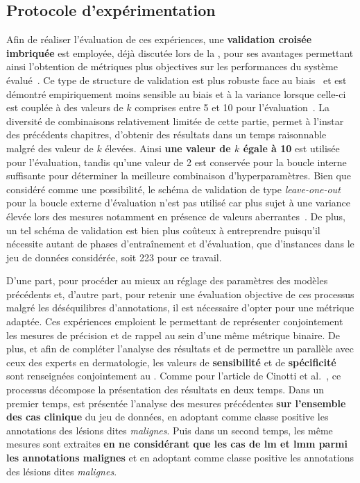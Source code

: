 \subsection{Protocole d'expérimentation}
Afin de réaliser l'évaluation de ces expériences, une \textbf{validation croisée imbriquée} est employée, déjà discutée lors de la , pour ses avantages permettant ainsi l'obtention de métriques plus objectives sur les performances du système évalué~\cite{Cawley2010}. Ce type de structure de validation est plus robuste face au biais~\cite{Cawley2010} et est démontré empiriquement moins sensible au biais et à la variance lorsque celle-ci est couplée à des valeurs de $k$ comprises entre 5 et 10 pour l'évaluation~\cite{James2000}. La diversité de combinaisons relativement limitée de cette partie, permet à l'instar des précédents chapitres, d'obtenir des résultats dans un temps raisonnable malgré des valeur de $k$ élevées. Ainsi \textbf{une valeur de $k$ égale à 10} est utilisée pour l'évaluation, tandis qu'une valeur de 2 est conservée pour la boucle interne suffisante pour déterminer la meilleure combinaison d'hyperparamètres. Bien que considéré comme une possibilité, le schéma de validation de type \textit{leave-one-out} pour la boucle externe d'évaluation n'est pas utilisé car plus sujet à une variance élevée lors des mesures notamment en présence de valeurs aberrantes~\cite{Bengio2004}. De plus, un tel schéma de validation est bien plus coûteux à entreprendre puisqu'il nécessite autant de phases d'entraînement et d'évaluation, que d'instances dans le jeu de données considérée, soit 223 pour ce travail.\par

D'une part, pour procéder au mieux au réglage des paramètres des modèles précédents et, d'autre part, pour retenir une évaluation objective de ces processus malgré les déséquilibres d'annotations, il est nécessaire d'opter pour une métrique adaptée. Ces expériences emploient le \textbf{\fscore{}} permettant de représenter conjointement les mesures de précision et de rappel au sein d'une même métrique binaire. De plus, et afin de compléter l'analyse des résultats et de permettre un parallèle avec ceux des experts en dermatologie, les valeurs de \textbf{sensibilité} et de \textbf{spécificité} sont renseignées conjointement au \fscore{}. Comme pour l'article de Cinotti et al.~\cite{Cinotti2016}, ce processus décompose la présentation des résultats en deux temps. Dans un premier temps, est présentée l'analyse des mesures précédentes \textbf{sur l'ensemble des cas clinique} du jeu de données, en adoptant comme classe positive les annotations des lésions dites \textit{malignes}. Puis dans un second temps, les même mesures sont extraites \textbf{en ne considérant que les cas de \textbf{\gls{lm} et \gls{lmm}} parmi les annotations malignes} et en adoptant comme classe positive les annotations des lésions dites \textit{malignes}.\par

